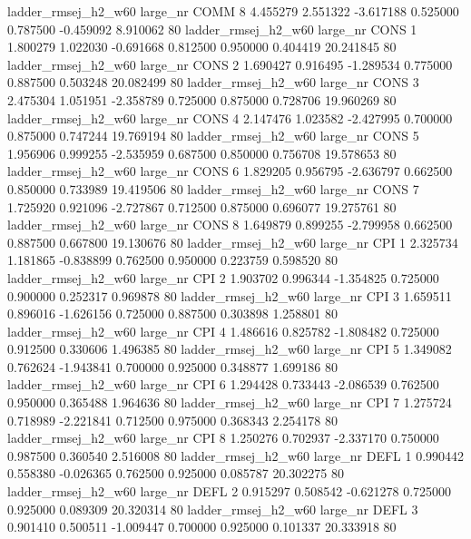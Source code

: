 ladder_rmsej_h2_w60   large_nr     COMM                 8  4.455279  2.551322  -3.617188 0.525000 0.787500 -0.459092    8.910062 80
ladder_rmsej_h2_w60   large_nr     CONS                 1  1.800279  1.022030  -0.691668 0.812500 0.950000  0.404419   20.241845 80
ladder_rmsej_h2_w60   large_nr     CONS                 2  1.690427  0.916495  -1.289534 0.775000 0.887500  0.503248   20.082499 80
ladder_rmsej_h2_w60   large_nr     CONS                 3  2.475304  1.051951  -2.358789 0.725000 0.875000  0.728706   19.960269 80
ladder_rmsej_h2_w60   large_nr     CONS                 4  2.147476  1.023582  -2.427995 0.700000 0.875000  0.747244   19.769194 80
ladder_rmsej_h2_w60   large_nr     CONS                 5  1.956906  0.999255  -2.535959 0.687500 0.850000  0.756708   19.578653 80
ladder_rmsej_h2_w60   large_nr     CONS                 6  1.829205  0.956795  -2.636797 0.662500 0.850000  0.733989   19.419506 80
ladder_rmsej_h2_w60   large_nr     CONS                 7  1.725920  0.921096  -2.727867 0.712500 0.875000  0.696077   19.275761 80
ladder_rmsej_h2_w60   large_nr     CONS                 8  1.649879  0.899255  -2.799958 0.662500 0.887500  0.667800   19.130676 80
ladder_rmsej_h2_w60   large_nr      CPI                 1  2.325734  1.181865  -0.838899 0.762500 0.950000  0.223759    0.598520 80
ladder_rmsej_h2_w60   large_nr      CPI                 2  1.903702  0.996344  -1.354825 0.725000 0.900000  0.252317    0.969878 80
ladder_rmsej_h2_w60   large_nr      CPI                 3  1.659511  0.896016  -1.626156 0.725000 0.887500  0.303898    1.258801 80
ladder_rmsej_h2_w60   large_nr      CPI                 4  1.486616  0.825782  -1.808482 0.725000 0.912500  0.330606    1.496385 80
ladder_rmsej_h2_w60   large_nr      CPI                 5  1.349082  0.762624  -1.943841 0.700000 0.925000  0.348877    1.699186 80
ladder_rmsej_h2_w60   large_nr      CPI                 6  1.294428  0.733443  -2.086539 0.762500 0.950000  0.365488    1.964636 80
ladder_rmsej_h2_w60   large_nr      CPI                 7  1.275724  0.718989  -2.221841 0.712500 0.975000  0.368343    2.254178 80
ladder_rmsej_h2_w60   large_nr      CPI                 8  1.250276  0.702937  -2.337170 0.750000 0.987500  0.360540    2.516008 80
ladder_rmsej_h2_w60   large_nr     DEFL                 1  0.990442  0.558380  -0.026365 0.762500 0.925000  0.085787   20.302275 80
ladder_rmsej_h2_w60   large_nr     DEFL                 2  0.915297  0.508542  -0.621278 0.725000 0.925000  0.089309   20.320314 80
ladder_rmsej_h2_w60   large_nr     DEFL                 3  0.901410  0.500511  -1.009447 0.700000 0.925000  0.101337   20.333918 80
